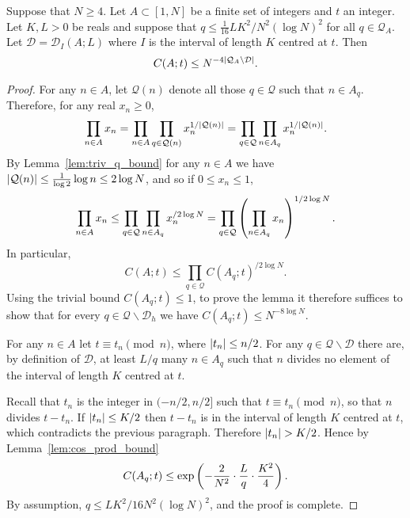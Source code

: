 \begin{lemma}\label{lem:minor2_ind_bound}
  \leanok
Suppose that $N\geq 4$. Let $A\subset [1,N]$ be a finite set of integers and $t$ an integer. Let $K,L>0$ be reals and suppose that $q\leq \tfrac{1}{16}LK^2/N^2(\log N)^2$ for all $q\in \mathcal{Q}_A$. Let $\mathcal{D}=\mathcal{D}_I(A;L)$ where $I$ is the interval of length $K$ centred at $t$. Then
\[C(A;t)\leq N^{-4\left\lvert \mathcal{Q}_A\backslash\mathcal{D}\right\rvert}.\]
\end{lemma}
\begin{proof}
  \leanok
{}
For any $n\in A$, let $\mathcal{Q}(n)$ denote all those $q\in \mathcal{Q}$ such that $n\in A_q$. Therefore, for any real $x_n\geq 0$,
\[\prod_{n\in A}x_n=\prod_{n\in A}\prod_{q\in \mathcal{Q}(n)}x_n^{1/\left\lvert \mathcal{Q}(n)\right\rvert}
=\prod_{q\in\mathcal{Q}}\prod_{n\in A_q}x_n^{1/\left\lvert \mathcal{Q}(n)\right\rvert}.\]
By Lemma~\ref{lem:triv_q_bound} for any $n\in A$ we have $\left\lvert \mathcal{Q}(n)\right\rvert\leq \tfrac{1}{\log 2}\log n\leq 2\log N$, and so if $0\leq x_n\leq 1$,
\[\prod_{n\in A}x_n\leq \prod_{q\in\mathcal{Q}}\prod_{n\in A_q}x_n^{/2\log N}=\prod_{q\in \mathcal{Q}}\left( \prod_{n\in A_q}x_n\right)^{1/2\log N}.\]
In particular,
 \[C(A;t)\leq \prod_{q\in \mathcal{Q}}C(A_q;t)^{/2\log N}.\]
 Using the trivial bound $C(A_q;t)\leq 1$, to prove the lemma it therefore suffices to show that for every $q\in\mathcal{Q}\backslash\mathcal{D}_h$ we have $C(A_q;t)\leq N^{-8\log N}$.

For any $n\in A$ let $t\equiv t_n\pmod{n}$, where $\left\lvert t_n\right\rvert\leq n/2$. For any $q\in\mathcal{Q}\backslash \mathcal{D}$ there are, by definition of $\mathcal{D}$, at least $L/q$ many $n\in A_q$ such that $n$ divides no element of the interval of length $K$ centred at $t$.

Recall that $t_n$ is the integer in $(-n/2,n/2]$ such that $t\equiv t_n\pmod{n}$, so that $n$ divides $t-t_n$. If $\left\lvert t_n\right\rvert\leq K/2$ then $t-t_n$ is in the interval of length $K$ centred at $t$, which contradicts the previous paragraph. Therefore $\left\lvert t_n\right\rvert>K/2$. Hence by Lemma~\ref{lem:cos_prod_bound}
\[C(A_q;t)\leq\exp\left( -\frac{2}{N^2}\cdot \frac{L}{q}\cdot \frac{K^2}{4}\right).\]
By assumption, $q\leq LK^2/16N^2(\log N)^2$, and the proof is complete.
\end{proof}

